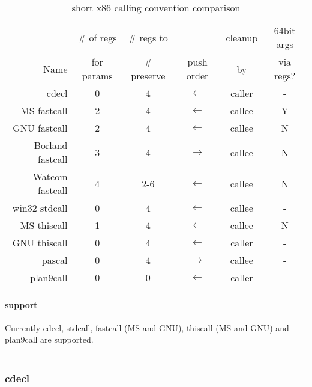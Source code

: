\begin{table}[h]
\begin{tabular*}{0.95\textwidth}{rccccc}
                 & \# of regs & \# regs to  &               & cleanup & 64bit args \\
Name             & for params & \# preserve & push order    & by      & via regs?  \\
\hline                           
cdecl            & 0          & 4           & $\leftarrow$  & caller  & -          \\
MS fastcall      & 2          & 4           & $\leftarrow$  & callee  & Y          \\
GNU fastcall     & 2          & 4           & $\leftarrow$  & callee  & N          \\
Borland fastcall & 3          & 4           & $\rightarrow$ & callee  & N          \\
Watcom fastcall  & 4          & 2-6         & $\leftarrow$  & callee  & N          \\
win32 stdcall    & 0          & 4           & $\leftarrow$  & callee  & -          \\
MS thiscall      & 1          & 4           & $\leftarrow$  & callee  & N          \\
GNU thiscall     & 0          & 4           & $\leftarrow$  & caller  & -          \\
pascal           & 0          & 4           & $\rightarrow$ & callee  & -          \\
plan9call        & 0          & 0           & $\leftarrow$  & caller  & -          \\
\end{tabular*}
\caption{short x86 calling convention comparison}
\end{table}


\paragraph{ support}

Currently cdecl, stdcall, fastcall (MS and GNU), thiscall (MS and GNU) and
plan9call are supported.\\
\\


\newpage


\subsubsection{cdecl}


